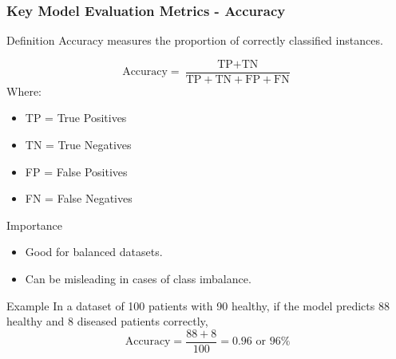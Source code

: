 \documentclass[aspectratio=169]{beamer}
\begin{document}
\begin{frame}[fragile]
    \frametitle{Key Model Evaluation Metrics - Accuracy}
    \begin{block}{Definition}
        Accuracy measures the proportion of correctly classified instances.
    \end{block}
    
    \begin{equation}
        \text{Accuracy} = \frac{\text{TP} + \text{TN}}{\text{TP} + \text{TN} + \text{FP} + \text{FN}}
    \end{equation}
    Where: 
    \begin{itemize}
        \item TP = True Positives
        \item TN = True Negatives
        \item FP = False Positives
        \item FN = False Negatives
    \end{itemize}

    \begin{block}{Importance}
        \begin{itemize}
            \item Good for balanced datasets.
            \item Can be misleading in cases of class imbalance.
        \end{itemize}
    \end{block}
    
    \begin{block}{Example}
        In a dataset of 100 patients with 90 healthy, if the model predicts 88 healthy and 8 diseased patients correctly, 
        \[
        \text{Accuracy} = \frac{88 + 8}{100} = 0.96 \text{ or } 96\%
        \]
    \end{block}
\end{frame}
\end{document}
